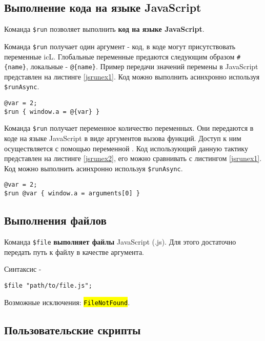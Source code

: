 \documentclass[a4paper, 14pt]{extarticle}
\newcommand{\ferror}[1]{{\fontsize{11pt}{12pt}\tt{\sethlcolor{yellow}\hl{#1}}}}
\begin{document}
\subsection{Выполнение кода на языке JavaScript}

Команда \lstinline|$run| позволяет выполнить {\bf код на языке JavaScript}.

\code{[icL]} Команда \lstinline|$run| получает один аргумент - код, в коде могут присутствовать переменные icL. Глобальные переменные предаются следующим образом \lstinline|#{name}|, локальные - \lstinline|@{name}|. Пример передачи значений перемены в JavaScript представлен на листинге \ref{jsrunex1}. Код можно выполнить асинхронно используя \lstinline|$runAsync|.

\begin{lstlisting}[caption=Выполнение кода на языке JavaScript (icL), label=jsrunex1]
@var = 2;
$run { window.a = @{var} }
\end{lstlisting}

\code{[w3c]} Команда \lstinline|$run| получает переменное количество переменных. Они передаются в коде на языке JavaScript в виде аргументов вызова функций. Доступ к ним осуществляется с помощью переменной . Код использующий данную тактику представлен на листинге \ref{jsrunex2}, его можно сравнивать с листингом \ref{jsrunex1}. Код можно выполнить асинхронно используя \lstinline|$runAsync|.

\begin{lstlisting}[caption=Выполнение кода на языке JavaScript (w3c), label=jsrunex2]
@var = 2;
$run @var { window.a = arguments[0] }
\end{lstlisting}

\subsection{Выполнения файлов}

Команда \lstinline|$file| {\bf выполняет файлы} JavaScript (.js). Для этого достаточно передать путь к файлу в качестве аргумента.

Синтаксис -
\begin{lstlisting}[numbers=none]
$file "path/to/file.js";
\end{lstlisting}

Возможные исключения: \ferror{FileNotFound}.

\subsection{Пользовательские скрипты}
\end{document}
